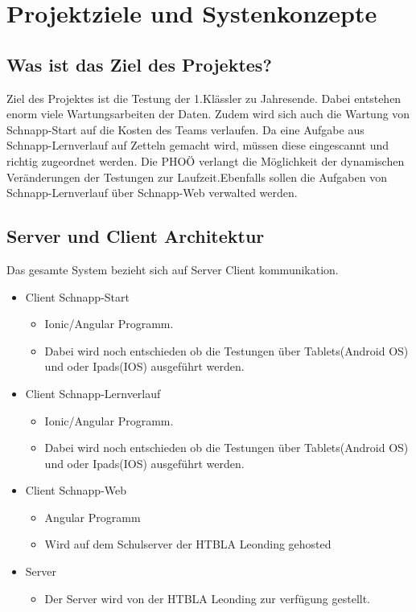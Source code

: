 \documentclass[12pt]{article}
\theoremstyle{definition}
\begin{document}
\pagebreak

\section{Projektziele und Systenkonzepte}

\subsection{Was ist das Ziel des Projektes?}

Ziel des Projektes ist die Testung der 1.Klässler zu Jahresende. Dabei entstehen enorm viele Wartungsarbeiten der Daten. Zudem wird sich auch die Wartung von Schnapp-Start auf die Kosten des Teams verlaufen. Da eine Aufgabe aus Schnapp-Lernverlauf auf Zetteln gemacht wird, müssen diese eingescannt und richtig zugeordnet werden. Die PHOÖ verlangt die Möglichkeit der dynamischen Veränderungen der Testungen zur Laufzeit.Ebenfalls sollen die Aufgaben von Schnapp-Lernverlauf über Schnapp-Web verwalted werden.

\subsection{Server und Client Architektur}

Das gesamte System bezieht sich auf Server Client kommunikation.
\newline

\begin{itemize}
\item Client Schnapp-Start
    \begin{itemize}
        \item Ionic/Angular Programm.
	    \item Dabei wird noch entschieden ob die Testungen über Tablets(Android OS) und oder Ipads(IOS) ausgeführt werden.
    \end{itemize}
\item Client Schnapp-Lernverlauf
    \begin{itemize}
    	\item Ionic/Angular Programm.
	    \item Dabei wird noch entschieden ob die Testungen über Tablets(Android OS) und oder Ipads(IOS) ausgeführt werden.
    \end{itemize}
\item Client Schnapp-Web
    \begin{itemize}
	    \item Angular Programm
	    \item Wird auf dem Schulserver der HTBLA Leonding gehosted
    \end{itemize}
\item Server
    \begin{itemize}
	   \item Der Server wird von der HTBLA Leonding zur verfügung gestellt.
	\end{itemize}
\end{itemize}
\end{document}
